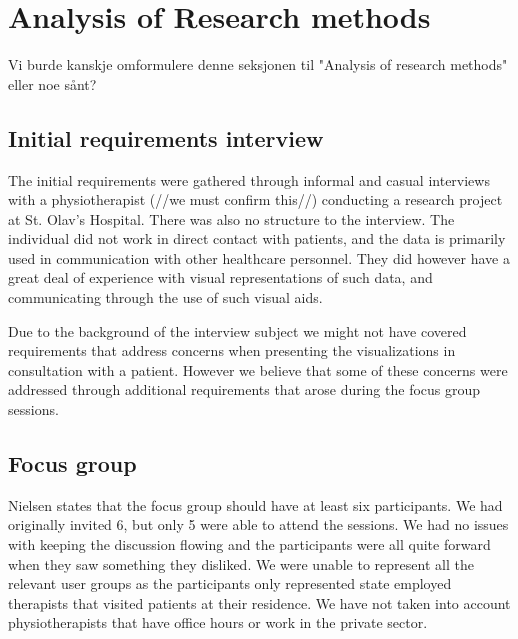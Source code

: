\chapter{Analysis of Research methods}
Vi burde kanskje omformulere denne seksjonen til "Analysis of research methods" eller noe sånt?


\section{Initial requirements interview}
The initial requirements were gathered through informal and casual interviews with a physiotherapist (//we must confirm this//) conducting a research project at St. Olav's Hospital. There was also no structure to the interview. The individual did not work in direct contact with patients, and the data is primarily used in communication with other healthcare personnel. 
They did however have a great deal of experience with visual representations of such data, and communicating through the use of such visual aids.

Due to the background of the interview subject we might not have covered requirements that address concerns when presenting the visualizations in consultation with a patient. 
However we believe that some of these concerns were addressed through additional requirements that arose during the focus group sessions.

\section{Focus group}
Nielsen states that the focus group should have at least six participants. We had originally invited 6, but only 5 were able to attend the sessions. We had no issues with keeping the discussion flowing and the participants were all quite forward when they saw something they disliked. We were unable to represent all the relevant user groups as the participants only represented state employed therapists that visited patients at their residence. We have not taken into account physiotherapists that have office hours or work in the private sector.

